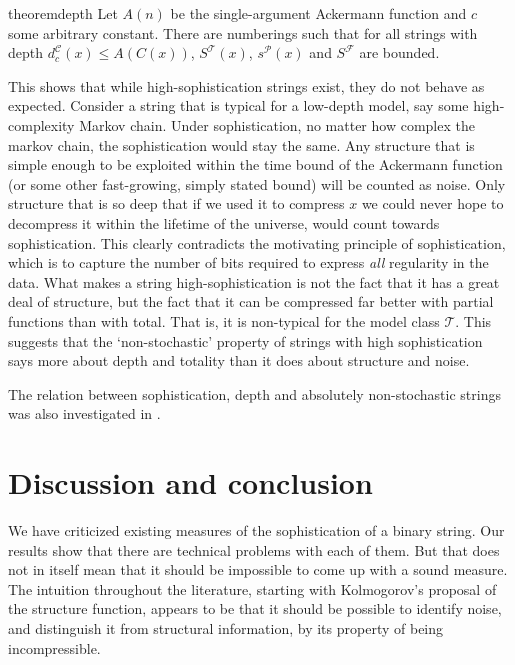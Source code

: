 \documentclass{style/llncs}
\newcommand{\C}{\mathscr C}
\newcommand{\T}{\mathscr T}
\newcommand{\F}{\mathscr F}
\renewcommand{\P}{\mathscr P}
\newcommand{\s}{S}
\begin{document}
\begin{restatable}{theorem}{depth}
Let $A(n)$ be the single-argument Ackermann function and $c$ some arbitrary constant. There are numberings such that for all strings with depth $d^\C_c(x) \leq A(C(x))$, $\s^\T(x)$, $s^\P(x)$ and $\s^\F$ are bounded.
\end{restatable}
\noindent This shows that while high-sophistication strings exist, they do not behave as expected. Consider a string that is typical for a low-depth model, say some high-complexity Markov chain. Under sophistication, no matter how complex the markov chain, the sophistication would stay the same. Any structure that is simple enough to be exploited within the time bound of the Ackermann function (or some other fast-growing, simply stated bound) will be counted as noise. Only structure that is so deep that if we used it to compress $x$ we could never hope to decompress it within the lifetime of the universe, would count towards sophistication. 
This clearly contradicts the motivating principle of sophistication, which is to capture the number of bits required to express \emph{all} regularity in the data. 
What makes a string high-sophistication is not the fact that it has a great deal of structure, but the fact that it can be compressed far better with partial functions than with total. That is, it is non-typical for the model class $\T$. This suggests that the `non-stochastic' property of strings with high sophistication \cite{shen1983concept,vereshchagin2004kolmogorov} says more about depth and totality than it does about structure and noise.

The relation between sophistication, depth and absolutely non-stochastic strings was also investigated in \cite{antunes2013sophistication}.

\section{Discussion and conclusion}
\label{section:conclusion}

We have criticized existing measures of the sophistication of a binary string. Our results show that there are technical problems with each of them. But that does not in itself mean that it should be impossible to come up with a sound measure. The intuition throughout the literature, starting with Kolmogorov's proposal of the structure function, appears to be that it should be possible to identify noise, and distinguish it from structural information, by its property of being incompressible.
\end{document}

